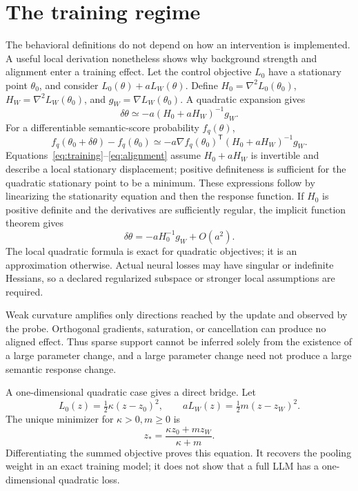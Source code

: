 \documentclass[11pt,letterpaper]{article}
\theoremstyle{definition}\newtheorem{definition}[theorem]{Definition}
\begin{document}
\section{The training regime}
The behavioral definitions do not depend on how an intervention is implemented. A useful local derivation nonetheless shows why background strength and alignment enter a training effect. Let the control objective $L_0$ have a stationary point $\theta_0$, and consider $L_0(\theta)+aL_W(\theta)$. Define $H_0=\nabla^2L_0(\theta_0)$, $H_W=\nabla^2L_W(\theta_0)$, and $g_W=\nabla L_W(\theta_0)$. A quadratic expansion gives
\begin{equation}
\delta\theta\simeq-a(H_0+aH_W)^{-1}g_W.
\label{eq:training}
\end{equation}
For a differentiable semantic-score probability $f_q(\theta)$,
\begin{equation}
f_q(\theta_0+\delta\theta)-f_q(\theta_0)
\simeq-a\nabla f_q(\theta_0)^\mathsf T(H_0+aH_W)^{-1}g_W.
\label{eq:alignment}
\end{equation}
Equations~\eqref{eq:training}--\eqref{eq:alignment} assume $H_0+aH_W$ is invertible and describe a local stationary displacement; positive definiteness is sufficient for the quadratic stationary point to be a minimum. These expressions follow by linearizing the stationarity equation and then the response function. If $H_0$ is positive definite and the derivatives are sufficiently regular, the implicit function theorem gives
\begin{equation}
\delta\theta=-aH_0^{-1}g_W+O(a^2).
\end{equation}
The local quadratic formula is exact for quadratic objectives; it is an approximation otherwise. Actual neural losses may have singular or indefinite Hessians, so a declared regularized subspace or stronger local assumptions are required.

Weak curvature amplifies only directions reached by the update and observed by the probe. Orthogonal gradients, saturation, or cancellation can produce no aligned effect. Thus sparse support cannot be inferred solely from the existence of a large parameter change, and a large parameter change need not produce a large semantic response change.

A one-dimensional quadratic case gives a direct bridge. Let
\begin{equation}
L_0(z)=\tfrac12\kappa(z-z_0)^2,
\qquad aL_W(z)=\tfrac12m(z-z_W)^2.
\end{equation}
The unique minimizer for $\kappa>0,m\ge0$ is
\begin{equation}
z_* =\frac{\kappa z_0+mz_W}{\kappa+m}.
\label{eq:quadratic}
\end{equation}
Differentiating the summed objective proves this equation. It recovers the pooling weight in an exact training model; it does not show that a full LLM has a one-dimensional quadratic loss.
\end{document}
